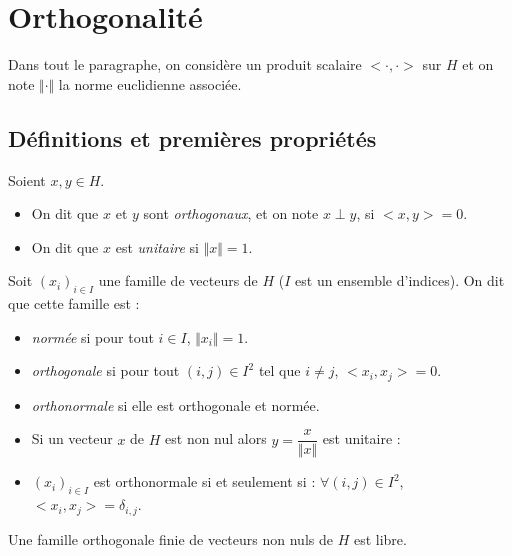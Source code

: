 \documentclass[french,11pt,twoside]{VcCours}
\begin{document}
\section{Orthogonalité}
Dans tout le paragraphe, on considère un produit scalaire $< \cdot , \cdot>$ sur $H$ et on note $\Vert \cdot \Vert$ la norme euclidienne associée.

\subsection{Définitions et premières propriétés}

\begin{Definition}{} Soient $x,y \in H$.
\begin{itemize}
\item On dit que $x$ et $y$ sont \emph{orthogonaux}, et on note $x \perp y$, si $<x,y>=0$.
\item On dit que $x$ est \emph{unitaire} si $\Vert x \Vert =1$.
\end{itemize}
\end{Definition}

\begin{Definition}{} Soit $(x_i)_{i \in I}$ une famille de vecteurs de $H$ ($I$ est un ensemble d'indices). On dit que cette famille est :
\begin{itemize}
\item \emph{normée} si pour tout $i \in I$, $\Vert x_i \Vert=1$.
\item \emph{orthogonale} si pour tout $(i,j) \in I^2$ tel que $i \neq j$, $<x_i ,x_j>=0$.
\item \emph{orthonormale} si elle est orthogonale et normée.
\end{itemize}
\end{Definition}

\begin{Remarques}{}
\begin{itemize}
\item Si un vecteur $x$ de $H$ est non nul alors $y = \dfrac{x}{\Vert x \Vert}$ est unitaire :

\vspace{2cm}
\item $(x_i)_{i \in I}$ est orthonormale si et seulement si : $\forall (i,j) \in I^2$, $<x_i,x_j>= \delta_{i,j}$.
\end{itemize}
\end{Remarques}

\begin{Proposition}{} Une famille orthogonale finie de vecteurs non nuls de $H$ est libre.
\end{Proposition}
\end{document}
